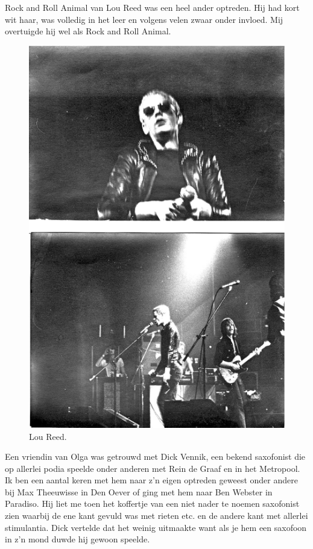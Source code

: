 \documentclass[12pt,twoside, openright]{memoir}
\begin{document}
Rock and Roll Animal van Lou Reed was een heel ander optreden. Hij had kort wit haar, was volledig in het leer en volgens velen zwaar onder invloed. Mij overtuigde hij wel als Rock and Roll Animal.

\begin{figure}
\includegraphics[width=\textwidth]{img/ch31/reed}
\caption*{\footnotesize Lou Reed.}
\end{figure}

Een vriendin van Olga was getrouwd met Dick Vennik, een bekend saxofonist die op allerlei podia speelde onder anderen met Rein de Graaf en in het Metropool. Ik ben een aantal keren met hem naar z’n eigen optreden geweest onder andere bij Max Theeuwisse in Den Oever of ging met hem naar Ben Webster in Paradiso. Hij liet me toen het koffertje van een niet nader te noemen saxofonist zien waarbij de ene kant gevuld was met rieten etc. en de andere kant met allerlei stimulantia. Dick vertelde dat het weinig uitmaakte want als je hem een saxofoon in z’n mond duwde hij gewoon speelde.
\end{document}
